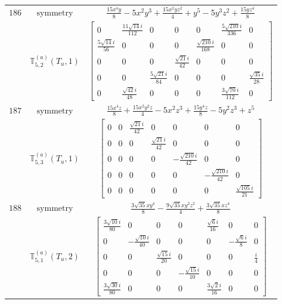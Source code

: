 \documentclass[fleqn,8pt,landscape]{jsarticle}
\begin{document}
\begin{longtable}{ccc}
$ 186 $ & $ \text{symmetry} $ & $ \frac{15 x^{4} y}{8} - 5 x^{2} y^{3} + \frac{15 x^{2} y z^{2}}{4} + y^{5} - 5 y^{3} z^{2} + \frac{15 y z^{4}}{8} $ \\
$  $ & $ \mathbb{T}_{5,2}^{(a)}(T_{u},1) $ & $ \begin{bmatrix} 0 & \frac{11 \sqrt{14} i}{112} & 0 & 0 & 0 & \frac{5 \sqrt{210} i}{336} & 0 \\ \frac{5 \sqrt{14} i}{56} & 0 & 0 & 0 & \frac{\sqrt{210} i}{168} & 0 & 0 \\ 0 & 0 & 0 & \frac{\sqrt{21} i}{42} & 0 & 0 & 0 \\ 0 & 0 & \frac{5 \sqrt{21} i}{84} & 0 & 0 & 0 & \frac{\sqrt{35} i}{28} \\ 0 & \frac{\sqrt{42} i}{48} & 0 & 0 & 0 & \frac{3 \sqrt{70} i}{112} & 0 \end{bmatrix} $ \\ \hline
$ 187 $ & $ \text{symmetry} $ & $ \frac{15 x^{4} z}{8} + \frac{15 x^{2} y^{2} z}{4} - 5 x^{2} z^{3} + \frac{15 y^{4} z}{8} - 5 y^{2} z^{3} + z^{5} $ \\
$  $ & $ \mathbb{T}_{5,3}^{(a)}(T_{u},1) $ & $ \begin{bmatrix} 0 & 0 & \frac{\sqrt{21} i}{42} & 0 & 0 & 0 & 0 \\ 0 & 0 & 0 & \frac{\sqrt{21} i}{42} & 0 & 0 & 0 \\ 0 & 0 & 0 & 0 & - \frac{\sqrt{210} i}{42} & 0 & 0 \\ 0 & 0 & 0 & 0 & 0 & - \frac{\sqrt{210} i}{42} & 0 \\ 0 & 0 & 0 & 0 & 0 & 0 & \frac{\sqrt{105} i}{21} \end{bmatrix} $ \\ \hline
$ 188 $ & $ \text{symmetry} $ & $ \frac{3 \sqrt{35} x y^{4}}{8} - \frac{9 \sqrt{35} x y^{2} z^{2}}{4} + \frac{3 \sqrt{35} x z^{4}}{8} $ \\
$  $ & $ \mathbb{T}_{5,1}^{(a)}(T_{u},2) $ & $ \begin{bmatrix} \frac{3 \sqrt{10} i}{80} & 0 & 0 & 0 & \frac{\sqrt{6} i}{16} & 0 & 0 \\ 0 & - \frac{\sqrt{10} i}{40} & 0 & 0 & 0 & - \frac{\sqrt{6} i}{8} & 0 \\ 0 & 0 & \frac{\sqrt{15} i}{20} & 0 & 0 & 0 & \frac{i}{4} \\ 0 & 0 & 0 & - \frac{\sqrt{15} i}{10} & 0 & 0 & 0 \\ \frac{3 \sqrt{30} i}{80} & 0 & 0 & 0 & \frac{3 \sqrt{2} i}{16} & 0 & 0 \end{bmatrix} $ \\ \hline

\end{longtable}
\end{document}

